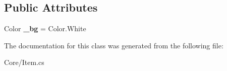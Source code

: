 \subsection*{Public Attributes}
\begin{DoxyCompactItemize}
\item 
\mbox{\label{class_space_v_i_l_1_1_core_1_1_item_aae320a8b6242699c7bad4fb5c5da7873}} 
Color {\bfseries \+\_\+bg} = Color.\+White
\end{DoxyCompactItemize}


The documentation for this class was generated from the following file\+:\begin{DoxyCompactItemize}
\item 
Core/Item.\+cs\end{DoxyCompactItemize}
